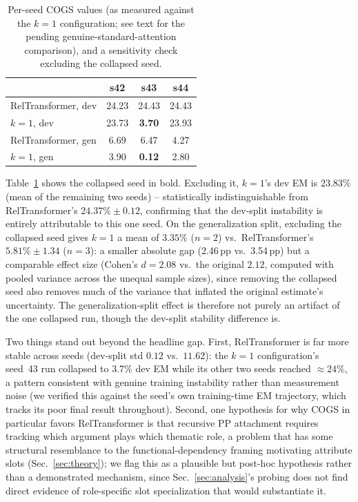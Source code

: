 \documentclass[review]{elsarticle}
\begin{document}
\begin{table}[t]
\centering
\caption{Per-seed COGS values (as measured against the $k{=}1$ configuration; see text for the pending genuine-standard-attention comparison), and a sensitivity check excluding the collapsed seed.}
\label{tab:cogs_perseed}
\small
\begin{tabular}{lccc}
\toprule
& \textbf{s42} & \textbf{s43} & \textbf{s44} \\
\midrule
RelTransformer, dev & 24.23 & 24.43 & 24.43 \\
$k{=}1$, dev & 23.73 & \textbf{3.70} & 23.93 \\
RelTransformer, gen & 6.69 & 6.47 & 4.27 \\
$k{=}1$, gen & 3.90 & \textbf{0.12} & 2.80 \\
\bottomrule
\end{tabular}
\end{table}

Table~\ref{tab:cogs_perseed} shows the collapsed seed in bold. Excluding it, $k{=}1$'s dev EM is $23.83\%$ (mean of the remaining two seeds) -- statistically indistinguishable from RelTransformer's $24.37\%{\pm}0.12$, confirming that the dev-split instability is entirely attributable to this one seed. On the generalization split, excluding the collapsed seed gives $k{=}1$ a mean of $3.35\%$ ($n{=}2$) vs.\ RelTransformer's $5.81\%{\pm}1.34$ ($n{=}3$): a smaller absolute gap (2.46\,pp vs.\ 3.54\,pp) but a comparable effect size (Cohen's $d{=}2.08$ vs.\ the original $2.12$, computed with pooled variance across the unequal sample sizes), since removing the collapsed seed also removes much of the variance that inflated the original estimate's uncertainty. The generalization-split effect is therefore not purely an artifact of the one collapsed run, though the dev-split stability difference is.

Two things stand out beyond the headline gap. First, RelTransformer is far more stable across seeds (dev-split std $0.12$ vs.\ $11.62$): the $k{=}1$ configuration's seed~43 run collapsed to $3.7\%$ dev EM while its other two seeds reached $\approx24\%$, a pattern consistent with genuine training instability rather than measurement noise (we verified this against the seed's own training-time EM trajectory, which tracks its poor final result throughout). Second, one hypothesis for why COGS in particular favors RelTransformer is that recursive PP attachment requires tracking which argument plays which thematic role, a problem that has some structural resemblance to the functional-dependency framing motivating attribute slots (Sec.~\ref{sec:theory}); we flag this as a plausible but post-hoc hypothesis rather than a demonstrated mechanism, since Sec.~\ref{sec:analysis}'s probing does not find direct evidence of role-specific slot specialization that would substantiate it.
\end{document}
